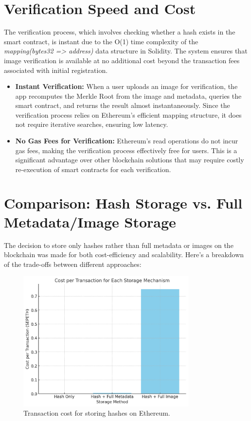 \section{Verification Speed and Cost}
The verification process, which involves checking whether a hash exists in the smart contract, is instant due to the O(1) time complexity of the \textit{mapping(bytes32 => address)} data structure in Solidity. The system ensures that image verification is available at no additional cost beyond the transaction fees associated with initial registration.
\begin{itemize}
    \item \textbf{Instant Verification:} When a user uploads an image for verification, the app recomputes the Merkle Root from the image and metadata, queries the smart contract, and returns the result almost instantaneously. Since the verification process relies on Ethereum’s efficient mapping structure, it does not require iterative searches, ensuring low latency.
    \item \textbf{No Gas Fees for Verification:} Ethereum’s read operations do not incur gas fees, making the verification process effectively free for users. This is a significant advantage over other blockchain solutions that may require costly re-execution of smart contracts for each verification.
\end{itemize}

\section{Comparison: Hash Storage vs. Full Metadata/Image Storage}
The decision to store only hashes rather than full metadata or images on the blockchain was made for both cost-efficiency and scalability. Here’s a breakdown of the trade-offs between different approaches:

\begin{figure}
    \centering
    \includegraphics[width=0.8\textwidth]{images/storageCost.png}
    \caption{Transaction cost for storing hashes on Ethereum.}
    \label{fig:transactionCost}
\end{figure}

